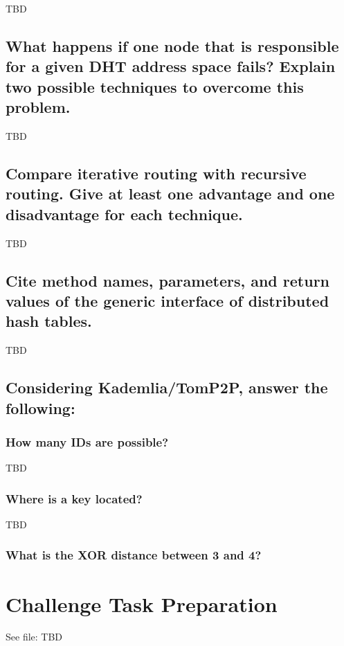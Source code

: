 \documentclass{article}
\begin{document}
TBD

\subsection{What happens if one node that is responsible for a given
DHT address space fails? Explain two possible techniques to overcome this problem.}

TBD

\subsection{Compare iterative routing with recursive routing.
Give at least one advantage and one disadvantage for each technique.}

TBD

\subsection{Cite method names, parameters, and return
values of the generic interface of distributed hash tables.}

TBD

\subsection{Considering Kademlia/TomP2P, answer the following:}
\subsubsection{How many IDs are possible?}

TBD

\subsubsection{Where is a key located?}

TBD

\subsubsection{What is the XOR distance between 3 and 4?}



\section{Challenge Task Preparation}

See file: TBD
\end{document}
